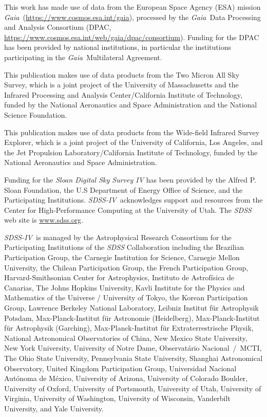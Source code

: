 \documentclass[modern]{aastex62}
\newcommand{\acronym}[1]{{\small{#1}}}
\newcommand{\project}[1]{\textsl{#1}}
\newcommand{\gaia}{\project{Gaia}}
\newcommand{\sdssiv}{\project{\acronym{SDSS-IV}}}
\begin{document}
This work has made use of data from the European Space Agency (\acronym{ESA}) mission
\gaia\ (\url{https://www.cosmos.esa.int/gaia}), processed by the \gaia\ Data
Processing and Analysis Consortium (\acronym{DPAC},
\url{https://www.cosmos.esa.int/web/gaia/dpac/consortium}). Funding for the
\acronym{DPAC}
has been provided by national institutions, in particular the institutions
participating in the \gaia\ Multilateral Agreement.

This publication makes use of data products from the Two Micron All Sky Survey, which is a joint project of the University of Massachusetts and the Infrared Processing and Analysis Center/California Institute of Technology, funded by the National Aeronautics and Space Administration and the National Science Foundation.

This publication makes use of data products from the Wide-field Infrared Survey Explorer, which is a joint project of the University of California, Los Angeles, and the Jet Propulsion Laboratory/California Institute of Technology, funded by the National Aeronautics and Space Administration.

Funding for the \project{Sloan Digital Sky Survey IV} has been provided by the Alfred P. Sloan Foundation, the U.S Department of Energy Office of Science, and the Participating Institutions. \sdssiv\ acknowledges
support and resources from the Center for High-Performance Computing at
the University of Utah. The \project{\acronym{SDSS}} web site is \url{www.sdss.org}.

\sdssiv\ is managed by the Astrophysical Research Consortium for the 
Participating Institutions of the \project{\acronym{SDSS}} Collaboration including the 
Brazilian Participation Group, the Carnegie Institution for Science, 
Carnegie Mellon University, the Chilean Participation Group, the French Participation Group, Harvard-Smithsonian Center for Astrophysics, 
Instituto de Astrof\'isica de Canarias, The Johns Hopkins University, 
Kavli Institute for the Physics and Mathematics of the Universe / 
University of Tokyo, the Korean Participation Group, Lawrence Berkeley National Laboratory, 
Leibniz Institut f\"ur Astrophysik Potsdam,  
Max-Planck-Institut f\"ur Astronomie (Heidelberg), 
Max-Planck-Institut f\"ur Astrophysik (Garching), 
Max-Planck-Institut f\"ur Extraterrestrische Physik, 
National Astronomical Observatories of China, New Mexico State University, 
New York University, University of Notre Dame, 
Observat\'ario Nacional~/~\acronym{MCTI}, The Ohio State University, 
Pennsylvania State University, Shanghai Astronomical Observatory, 
United Kingdom Participation Group,
Universidad Nacional Aut\'onoma de M\'exico, University of Arizona, 
University of Colorado Boulder, University of Oxford, University of Portsmouth, 
University of Utah, University of Virginia, University of Washington, University of Wisconsin, 
Vanderbilt University, and Yale University.
\end{document}
